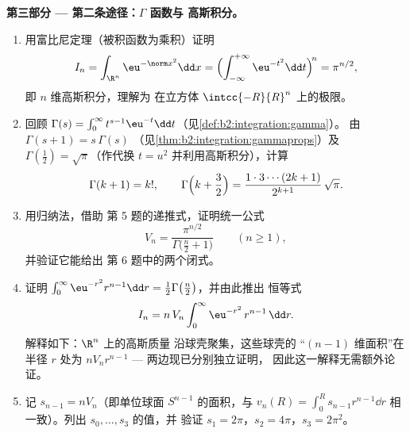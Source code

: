 \begin{problem}[{周末问题 --- $V_n =
\pi^{n/2}/\Gamma(\frac n2 + 1)$，以及高维的
奇异现象}]
\medskip
\noindent\textbf{第三部分 --- 第二条途径：$\Gamma$ 函数与
高斯积分。}
\begin{enumerate}[resume]
  \item 用富比尼定理（被积函数为乘积）证明
        \[
        I_n = \int_{\R^n}\eu^{-\norm
        x^2}\dd x
        = \Bigl(\int_{-\infty}^{+\infty}
        \eu^{-t^2}\dd t\Bigr)^{\!n} = \pi^{n/2},
        \]
        即 $n$ 维高斯积分，理解为
        在立方体 $\intcc{-R}{R}^n$ 上的极限。
  \item 回顾 $\Gamma(s) = \int_0^\infty t^{s-1}\eu^{-t}\dd
        t$（见\cref{def:b2:integration:gamma}）。
        由 $\Gamma(s+1) = s\,\Gamma(s)$
        （见\cref{thm:b2:integration:gammaprops}）及
        $\Gamma(\tfrac12) = \sqrt\pi$（作代换 $t = u^2$
        并利用高斯积分），计算
        \[
        \Gamma(k + 1) = k!,
        \qquad
        \Gamma\Bigl(k + \frac32\Bigr) =
        \frac{1\cdot3\cdots(2k+1)}{2^{k+1}}\,\sqrt\pi .
        \]
  \item 用归纳法，借助
        第 5 题的递推式，证明统一公式
        \[
        V_n = \frac{\pi^{n/2}}{\Gamma\bigl(\frac n2 +
        1\bigr)} \qquad (n \geq 1),
        \]
        并验证它能给出
        第 6 题中的两个闭式。
  \item 证明 $\int_0^\infty \eu^{-r^2}r^{n-1}\dd r =
        \tfrac12\Gamma\bigl(\tfrac n2\bigr)$，并由此推出
        恒等式
        \[
        I_n = n\,V_n\int_0^\infty \eu^{-r^2}\,r^{n-1}\,\dd r.
        \]
        解释如下：$\R^n$ 上的高斯质量
        沿球壳聚集，这些球壳的
        “$(n-1)$ 维面积”在半径 $r$ 处为
        $nV_nr^{n-1}$ --- 两边现已分别独立证明，
        因此这一解释无需额外论证。
  \item 记 $s_{n-1} = nV_n$（即单位球面
        $S^{n-1}$ 的面积，与 $v_n(R) = \int_0^R
        s_{n-1}r^{n-1}\dd r$ 相一致）。列出 $s_0, \dots, s_3$ 的值，并
        验证 $s_1 = 2\pi$，$s_2 = 4\pi$，$s_3 = 2\pi^2$。
\end{enumerate}


\end{problem}
